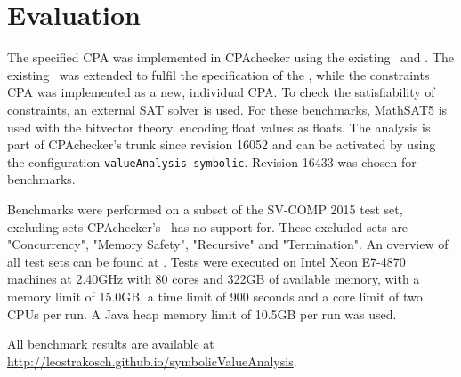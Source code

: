 \section{Evaluation}
The specified CPA was implemented in CPAchecker\cite{Beyer2011} using the existing \compositeCPA\ and \locationCPA.
The existing \ was extended to fulfil the specification of the \symbolicValueCPA,
while the constraints CPA was implemented as a new, individual CPA. To check the satisfiability of constraints, an external SAT solver is used.
For these benchmarks, MathSAT5 is used with the bitvector theory, encoding float values as floats.
The analysis is part of CPAchecker's trunk since revision 16052 and can be activated by using the configuration \texttt{valueAnalysis-symbolic}. Revision 16433 was chosen for benchmarks.

Benchmarks were performed on a subset of the SV-COMP 2015 test set, excluding sets CPAchecker's \ has no support for.
These excluded sets are "Concurrency", "Memory Safety", "Recursive" and "Termination". An overview of all test sets can be found at \cite{SV15Tasks}.
Tests were executed on Intel Xeon E7-4870 machines at 2.40GHz with 80 cores and 322GB of available memory, with a memory limit of 15.0GB, a time limit of 900 seconds and a core limit of two CPUs per run.
A Java heap memory limit of 10.5GB per run was used.

All benchmark results are available at \url{http://leostrakosch.github.io/symbolicValueAnalysis}.

